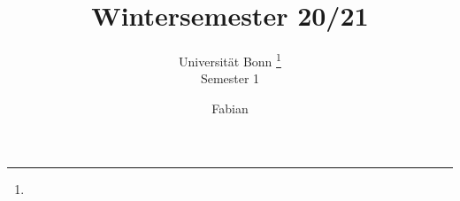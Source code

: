 \documentclass[a4paper, 10pt, oneside, openany,  bibliography=totocnumbered]{scrbook}
\begin{document}
\subject{Vorlesungsmitschriften}
\title{Wintersemester 20/21}
\subtitle{
  Universität Bonn \footnote{
   \centering
  }
  \\
  Semester 1
}
\author{Fabian}
\publishers{
  Online aufrufbar auf \texttt{\url{https://github.com/git-fabus/lecutres/blob/main/notes.pdf}.}
  \\
 Veränderungsvorschläge und Verbesserungen bitte an 
}

\frontmatter
\maketitle

\tableofcontents

\mainmatter


\appendix %
%

\backmatter
%
\end{document}
